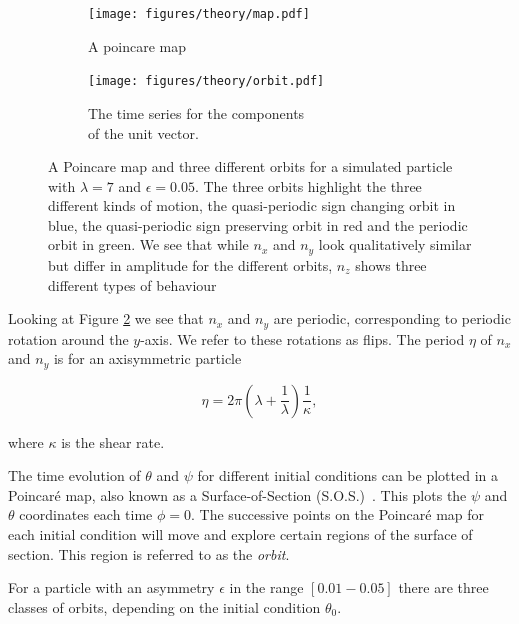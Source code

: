 \begin{figure}[H]
\centering
\begin{subfigure}[b]{0.45\textwidth}
\texttt{[image: figures/theory/map.pdf]}
\caption{A poincare map}\label{fig:orbitmap}
\end{subfigure}\hspace{1em}%
\begin{subfigure}[b]{0.5\textwidth}
\texttt{[image: figures/theory/orbit.pdf]}
\caption{The time series for the components \\ of the unit vector.}\label{fig:orbitparams}
\end{subfigure}
\caption{A Poincare map and three different orbits for a simulated particle with $\lambda=7$ and $\epsilon=0.05$. The three orbits highlight the three different kinds of motion, the quasi-periodic sign changing orbit in blue, the quasi-periodic sign preserving orbit in red and the periodic orbit in green. We see that while $n_x$ and $n_y$ look qualitatively similar but differ in amplitude for the different orbits, $n_z$ shows three different types of behaviour}
\label{fig:orbittypes}
\end{figure}



Looking at Figure \ref{fig:orbitparams} we see that $n_x$ and $n_y$ are periodic, corresponding to periodic rotation around the $y$-axis. We refer to these rotations as flips. The period $\eta$ of $n_x$ and $n_y$ is for an axisymmetric particle \cite{Jeffery}

\begin{equation}\label{eq:flipRate}
\eta = 2\pi \left( \lambda + \frac{1}{\lambda} \right)\frac{1}{\kappa},
\end{equation}

\noindent where $\kappa$ is the shear rate. 

The time evolution of $\theta$ and $\psi$ for different initial conditions can be plotted in a Poincaré map, also known as a Surface-of-Section (S.O.S.)~\cite{poincare}. This plots the $\psi$ and $\theta$ coordinates each time $\phi = 0$. The successive points on the Poincaré map for each initial condition will move and explore certain regions of the surface of section. This region is referred to as the \emph{orbit}. 

For a particle with an asymmetry $\epsilon$ in the range $\left[0.01-0.05\right]$ there are three classes of orbits, depending on the initial condition $\theta_0$.

